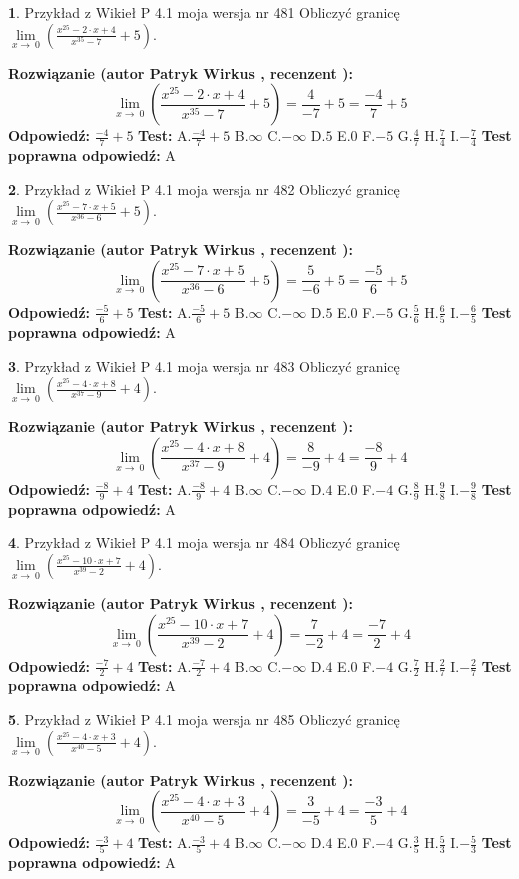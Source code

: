 \documentclass[12pt, a4paper]{article}
\theoremstyle{definition} %
\newtheorem{zad}{}
\newcommand{\zadStart}[1]{\begin{zad}#1\newline}
\newcommand{\zadStop}{\end{zad}}
\newcommand{\rozwStart}[2]{\noindent \textbf{Rozwiązanie (autor #1 , recenzent #2): }\newline}
\newcommand{\rozwStop}{\newline}
\newcommand{\odpStart}{\noindent \textbf{Odpowiedź:}\newline}
\newcommand{\odpStop}{\newline}
\newcommand{\testStart}{\noindent \textbf{Test:}\newline}
\newcommand{\testStop}{\newline}
\newcommand{\kluczStart}{\noindent \textbf{Test poprawna odpowiedź:}\newline}
\newcommand{\kluczStop}{\newline}
\begin{document}
\zadStart{Przykład z Wikieł P 4.1 moja wersja nr 481}
Obliczyć granicę $\lim\limits_{x\to\ 0}(\frac{x^{25}-2 \cdot x +4}{x^{35}-7}+5)$.
\zadStop
\rozwStart{Patryk Wirkus}{}
$$\lim\limits_{x\to\ 0}(\frac{x^{25}-2 \cdot x +4}{x^{35}-7}+5)=\frac{4}{-7}+5=\frac{-4}{7}+5$$
\rozwStop
\odpStart
$\frac{-4}{7}+5$
\odpStop
\testStart
A.$\frac{-4}{7}+5$
B.$\infty$
C.$-\infty$
D.$5$
E.$0$
F.$-5$
G.$\frac{4}{7}$
H.$\frac{7}{4}$
I.$-\frac{7}{4}$
\testStop
\kluczStart
A
\kluczStop



\zadStart{Przykład z Wikieł P 4.1 moja wersja nr 482}
Obliczyć granicę $\lim\limits_{x\to\ 0}(\frac{x^{25}-7 \cdot x +5}{x^{36}-6}+5)$.
\zadStop
\rozwStart{Patryk Wirkus}{}
$$\lim\limits_{x\to\ 0}(\frac{x^{25}-7 \cdot x +5}{x^{36}-6}+5)=\frac{5}{-6}+5=\frac{-5}{6}+5$$
\rozwStop
\odpStart
$\frac{-5}{6}+5$
\odpStop
\testStart
A.$\frac{-5}{6}+5$
B.$\infty$
C.$-\infty$
D.$5$
E.$0$
F.$-5$
G.$\frac{5}{6}$
H.$\frac{6}{5}$
I.$-\frac{6}{5}$
\testStop
\kluczStart
A
\kluczStop



\zadStart{Przykład z Wikieł P 4.1 moja wersja nr 483}
Obliczyć granicę $\lim\limits_{x\to\ 0}(\frac{x^{25}-4 \cdot x +8}{x^{37}-9}+4)$.
\zadStop
\rozwStart{Patryk Wirkus}{}
$$\lim\limits_{x\to\ 0}(\frac{x^{25}-4 \cdot x +8}{x^{37}-9}+4)=\frac{8}{-9}+4=\frac{-8}{9}+4$$
\rozwStop
\odpStart
$\frac{-8}{9}+4$
\odpStop
\testStart
A.$\frac{-8}{9}+4$
B.$\infty$
C.$-\infty$
D.$4$
E.$0$
F.$-4$
G.$\frac{8}{9}$
H.$\frac{9}{8}$
I.$-\frac{9}{8}$
\testStop
\kluczStart
A
\kluczStop



\zadStart{Przykład z Wikieł P 4.1 moja wersja nr 484}
Obliczyć granicę $\lim\limits_{x\to\ 0}(\frac{x^{25}-10 \cdot x +7}{x^{39}-2}+4)$.
\zadStop
\rozwStart{Patryk Wirkus}{}
$$\lim\limits_{x\to\ 0}(\frac{x^{25}-10 \cdot x +7}{x^{39}-2}+4)=\frac{7}{-2}+4=\frac{-7}{2}+4$$
\rozwStop
\odpStart
$\frac{-7}{2}+4$
\odpStop
\testStart
A.$\frac{-7}{2}+4$
B.$\infty$
C.$-\infty$
D.$4$
E.$0$
F.$-4$
G.$\frac{7}{2}$
H.$\frac{2}{7}$
I.$-\frac{2}{7}$
\testStop
\kluczStart
A
\kluczStop



\zadStart{Przykład z Wikieł P 4.1 moja wersja nr 485}
Obliczyć granicę $\lim\limits_{x\to\ 0}(\frac{x^{25}-4 \cdot x +3}{x^{40}-5}+4)$.
\zadStop
\rozwStart{Patryk Wirkus}{}
$$\lim\limits_{x\to\ 0}(\frac{x^{25}-4 \cdot x +3}{x^{40}-5}+4)=\frac{3}{-5}+4=\frac{-3}{5}+4$$
\rozwStop
\odpStart
$\frac{-3}{5}+4$
\odpStop
\testStart
A.$\frac{-3}{5}+4$
B.$\infty$
C.$-\infty$
D.$4$
E.$0$
F.$-4$
G.$\frac{3}{5}$
H.$\frac{5}{3}$
I.$-\frac{5}{3}$
\testStop
\kluczStart
A
\kluczStop
\end{document}
